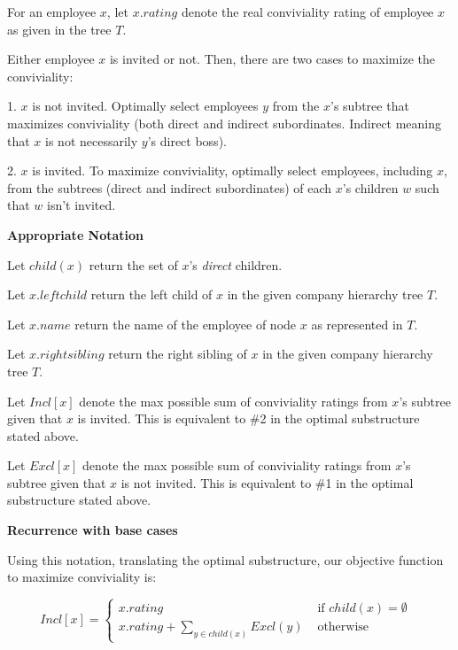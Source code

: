\documentclass[a4paper]{report}
\begin{document}
\begin{enumerate}
      For an employee $x$, let $x.rating$ denote the real conviviality rating of employee $x$ as given in the tree $T$. 

      Either employee $x$ is invited or not. Then, there are two cases to maximize the conviviality: 

      1. $x$ is not invited. Optimally select employees $y$ from the $x$'s subtree that maximizes conviviality (both direct and indirect subordinates. 
      Indirect meaning that $x$ is not necessarily $y$'s direct boss).
      
      2. $x$ is invited. To maximize conviviality, optimally select employees, including $x$, from the subtrees (direct and indirect subordinates) of each $x$'s children
      $w$ such that $w$ isn't invited.


      {\bf Appropriate Notation}

      Let $child(x)$ return the set of $x$'s {\it direct} children. 

      Let $x.leftchild$ return the left child of $x$ in the given company hierarchy tree $T$.

      Let $x.name$ return the name of the employee of node $x$ as represented in $T$.

      Let $x.rightsibling$ return the right sibling of $x$ in the given company hierarchy tree $T$.

      Let $Incl[x]$ denote the max possible sum of conviviality ratings from $x$'s subtree given that $x$ is invited. This is equivalent to \#2 in the optimal substructure
      stated above. 

      Let $Excl[x]$ denote the max possible sum of conviviality ratings from $x$'s subtree given that $x$ is not invited. This is equivalent to \#1 in the optimal substructure
      stated above. 

      {\bf Recurrence with base cases}

      Using this notation, translating the optimal substructure, our objective function to maximize conviviality is:


      \begin{displaymath}
        Incl[x] = \left\{
          \begin{array}{lr}
            x.rating & \text{ if $child(x) = \emptyset$ }\\
            x.rating + \sum_{y \in child(x)} Excl(y)  & \text{ otherwise }
          \end{array}
          \right.
        \end{displaymath} 


\end{enumerate}
\end{document}
